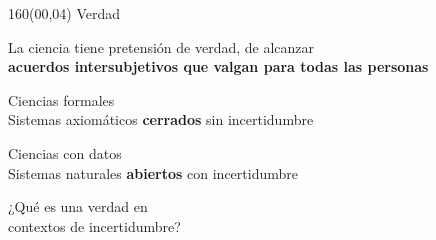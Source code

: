 \documentclass[shownotes,aspectratio=169]{beamer}
\begin{document}
%
%
%
%
%
%
%
%

\begin{frame}[plain]
\begin{textblock}{160}(00,04)
\centering
\LARGE Verdad
\end{textblock}
\vspace{1.3cm} \large

\centering

 La ciencia tiene pretensión de verdad, de alcanzar\\

\textbf{acuerdos intersubjetivos que valgan para todas las personas}

\vspace{0.7cm}

\pause

 \large Ciencias formales  \\
 \large  Sistemas axiomáticos \textbf{cerrados} sin incertidumbre\\

 \vspace{0.3cm}

  \pause

 \large Ciencias con datos  \\
\large Sistemas naturales \textbf{abiertos} con incertidumbre

\pause
\vspace{0.6cm}

\Large

¿Qué es una verdad en \\ contextos de incertidumbre?
%
%
%

\end{frame}
\end{document}
